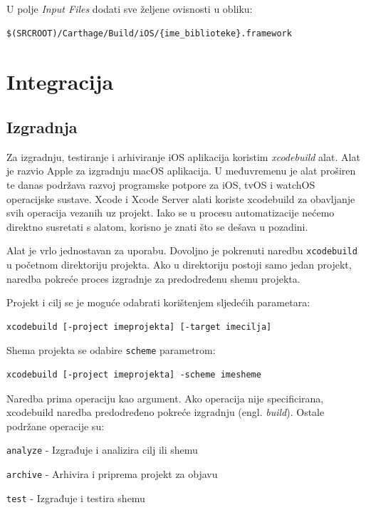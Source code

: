 \documentclass[times, utf8, diplomski, numeric]{fer}
\newcommand{\eng}[1]{(engl. \textit{#1})}
\begin{document}
\begin{appendices}
U polje \textit{Input Files} dodati sve željene ovisnosti u obliku:

\begin{verbatim}
$(SRCROOT)/Carthage/Build/iOS/{ime_biblioteke}.framework
\end{verbatim}


\section{Integracija}

\subsection{Izgradnja}

Za izgradnju, testiranje i arhiviranje iOS aplikacija koristim \textit{xcodebuild} alat. Alat je razvio Apple za izgradnju macOS aplikacija. U međuvremenu je alat proširen te danas podržava razvoj programske potpore za iOS, tvOS i watchOS operacijske sustave. Xcode i Xcode Server alati koriste xcodebuild za obavljanje svih operacija vezanih uz projekt. Iako se u procesu automatizacije nećemo direktno susretati s alatom, korisno je znati što se dešava u pozadini.

Alat je vrlo jednostavan za uporabu. Dovoljno je pokrenuti naredbu \verb|xcodebuild| u početnom direktoriju projekta. Ako u direktoriju postoji samo jedan projekt, naredba pokreće proces izgradnje za predodređenu shemu projekta.

Projekt i cilj se je moguće odabrati korištenjem sljedećih parametara:

\begin{verbatim}
xcodebuild [-project imeprojekta] [-target imecilja]
\end{verbatim}

Shema projekta se odabire \verb|scheme| parametrom:

\begin{verbatim}
xcodebuild [-project imeprojekta] -scheme imesheme
\end{verbatim}

Naredba prima operaciju kao argument. Ako operacija nije specificirana, xcodebuild naredba predodređeno pokreće izgradnju \eng{build}. Ostale podržane operacije su:

\verb|analyze| - Izgrađuje i analizira cilj ili shemu

\verb|archive| - Arhivira i priprema projekt za objavu

\verb|test| - Izgrađuje i testira shemu


\end{appendices}
\end{document}
